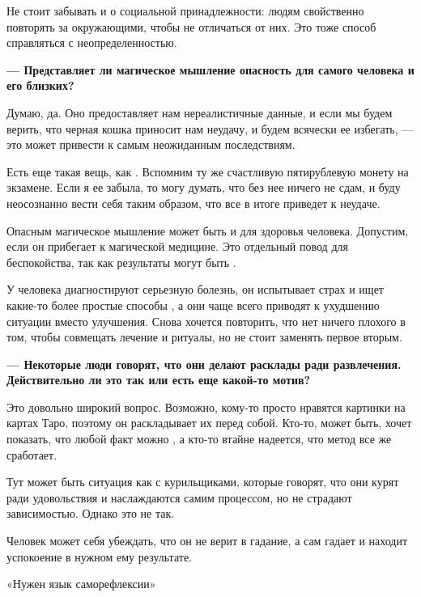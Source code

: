 Не стоит забывать и о социальной принадлежности: людям свойственно повторять за окружающими, чтобы не отличаться от них. Это тоже способ справляться с неопределенностью.

\textbf{--- Представляет ли магическое мышление опасность для самого человека и его близких?}

Думаю, да. Оно предоставляет нам нереалистичные данные, и если мы будем верить, что черная кошка приносит нам неудачу, и будем всячески ее избегать, — это может привести к самым неожиданным последствиям.

Есть еще такая вещь, как . Вспомним ту же счастливую пятирублевую монету на экзамене. Если я ее забыла, то могу думать, что без нее ничего не сдам, и буду неосознанно вести себя таким образом, что все в итоге приведет к неудаче.

Опасным магическое мышление может быть и для здоровья человека. Допустим, если он прибегает к магической медицине. Это отдельный повод для беспокойства, так как результаты могут быть .

У человека диагностируют серьезную болезнь, он испытывает страх и ищет какие-то более простые способы , а они чаще всего приводят к ухудшению ситуации вместо улучшения. Снова хочется повторить, что нет ничего плохого в том, чтобы совмещать лечение и ритуалы, но не стоит заменять первое вторым.

\textbf{--- Некоторые люди говорят, что они делают расклады ради развлечения. Действительно ли это так или есть еще какой-то мотив?}

Это довольно широкий вопрос. Возможно, кому-то просто нравятся картинки на картах Таро, поэтому он раскладывает их перед собой. Кто-то, может быть, хочет показать, что любой факт можно , а кто-то втайне надеется, что метод все же сработает.

Тут может быть ситуация как с курильщиками, которые говорят, что они курят ради удовольствия и наслаждаются самим процессом, но не страдают зависимостью. Однако это не так.

Человек может себя убеждать, что он не верит в гадание, а сам гадает и находит успокоение в нужном ему результате.

\vspace*{1em}
\begin{center}
    \Large «Нужен язык саморефлексии»
\end{center}
\vspace*{1em}

